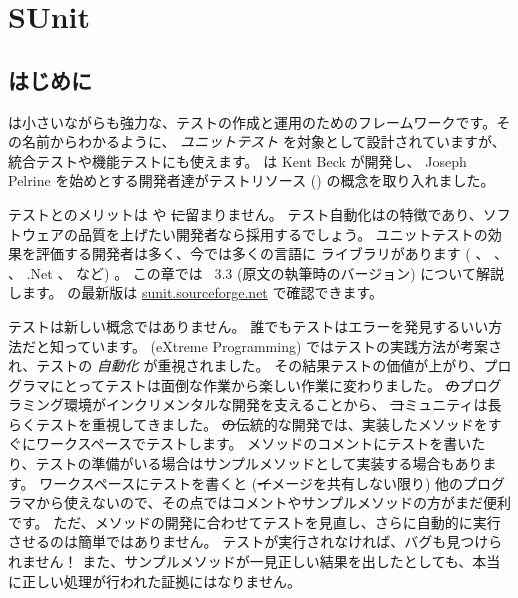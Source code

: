 \documentclass[a4paper,10pt,twoside]{book}
\begin{document}
	\sloppy
\fi
\chapter{SUnit}


\section{はじめに}

 は小さいながらも強力な、テストの作成と運用のためのフレームワークです。その名前からわかるように、 \emph{ユニットテスト} を対象として設計されていますが、統合テストや機能テストにも使えます。 \sunit は Kent Beck が開発し、 Joseph Pelrine を始めとする開発者達がテストリソース () の概念を取り入れました。


テストとのメリットは \pharo や \st に留まりません。
テスト自動化はの特徴であり、ソフトウェアの品質を上げたい開発者なら採用するでしょう。 
ユニットテストの効果を評価する開発者は多く、今では多くの言語に \xUnit ライブラリがあります ( 、  、  、 .Net 、 など) 。
この章では \SUnit~3.3 (原文の執筆時のバージョン) について解説します。
\sunit の最新版は \url{sunit.sourceforge.net} で確認できます。

テストは新しい概念ではありません。
誰でもテストはエラーを発見するいい方法だと知っています。
\mbox{} (eXtreme Programming) ではテストの実践方法が考案され、テストの \emph{自動化} が重視されました。
その結果テストの価値が上がり、プログラマにとってテストは面倒な作業から楽しい作業に変わりました。
\st のプログラミング環境がインクリメンタルな開発を支えることから、 \st コミュニティは長らくテストを重視してきました。
\st の伝統的な開発では、実装したメソッドをすぐにワークスペースでテストします。
メソッドのコメントにテストを書いたり、テストの準備がいる場合はサンプルメソッドとして実装する場合もあります。
ワークスペースにテストを書くと (\st イメージを共有しない限り) 他のプログラマから使えないので、その点ではコメントやサンプルメソッドの方がまだ便利です。
ただ、メソッドの開発に合わせてテストを見直し、さらに自動的に実行させるのは簡単ではありません。
テストが実行されなければ、バグも見つけられません！
また、サンプルメソッドが一見正しい結果を出したとしても、本当に正しい処理が行われた証拠にはなりません。
\end{document}
